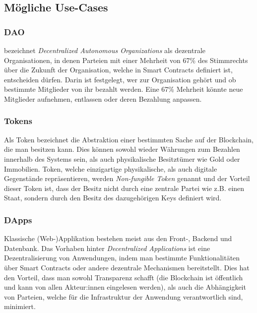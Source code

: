 \subsection{Mögliche Use-Cases}
\subsubsection{DAO}
\cite{buterin_whitepaper_2013} bezeichnet \emph{Decentralized Autonomous Organizations} als dezentrale Organisationen, in denen Parteien mit einer Mehrheit von 67\% des Stimmrechts über die Zukunft der Organisation, welche in Smart Contracts definiert ist, entscheiden dürfen. Darin ist festgelegt, wer zur Organisation gehört und ob bestimmte Mitglieder von ihr bezahlt werden. Eine 67\% Mehrheit könnte neue Mitglieder aufnehmen, entlassen oder deren Bezahlung anpassen.
\subsubsection{Tokens}
Als Token bezeichnet \cite[S. 315]{antanopoulos_2018} die Abstraktion einer bestimmten Sache auf der Blockchain, die man besitzen kann. Dies können sowohl wieder Währungen zum Bezahlen innerhalb des Systems sein, als auch physikalische Besitztümer wie Gold oder Immobilien. Token, welche einzigartige physikalische, als auch digitale Gegenstände repräsentieren, werden \emph{Non-fungible Token} genannt und der Vorteil dieser Token ist, dass der Besitz nicht durch eine zentrale Partei wie z.B. einen Staat, sondern durch den Besitz des dazugehörigen Keys definiert wird.
\subsubsection{DApps}
Klassische (Web-)Applikation bestehen meist aus den Front-, Backend und Datenbank. Das Vorhaben hinter \emph{Decentralized Applications} ist eine Dezentralisierung von Anwendungen, indem man bestimmte Funktionalitäten über Smart Contracts oder andere dezentrale Mechanismen bereitstellt. Dies hat den Vorteil, dass man sowohl Transparenz schafft (die Blockchain ist öffentlich und kann von allen Akteur:innen eingelesen werden), als auch die Abhängigkeit von Parteien, welche für die Infrastruktur der Anwendung verantwortlich sind, minimiert.